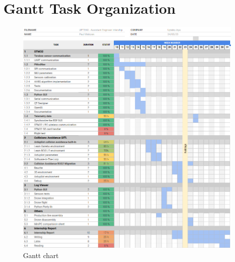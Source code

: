 \chapter{Gantt Task Organization}
\begin{figure}[H]
    \centering
    \includegraphics[width=0.9\linewidth]{./gantt/gantt.png}
    \caption{Gantt chart}
\end{figure}